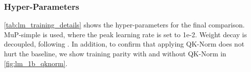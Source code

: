 \subsubsection{Hyper-Parameters}
\begin{table}[h]
\centering
\caption{Training details for the Llama-style 1B LM training.}
\label{tab:lm_training_details}
\end{table}
\cref{tab:lm_training_details} shows the hyper-parameters for the final comparison. MuP-simple \citep{DBLP:journals/corr/abs-2309-14322} is used, where the peak learning rate is set to 1e-2. Weight decay is decoupled, following \cite{loshchilov2017decoupled}. In addition, to confirm that applying QK-Norm does not hurt the baseline, we show training parity with and without QK-Norm in \cref{fig:lm_1b_qknorm}.
